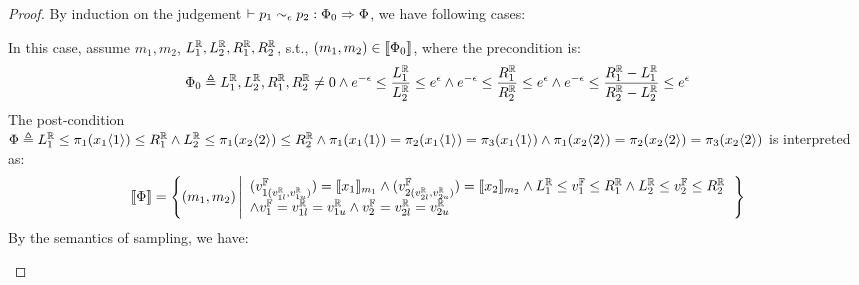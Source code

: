 \documentclass[a4paper,11pt]{article}
\begin{document}
\begin{proof}
By induction on the judgement $\vdash p_1	
\sim_{\epsilon}
p_2 :
\Phi_0 \Rightarrow \Phi $, we have following cases:
\begin{itemize}
\caseL{\[
	\inferrule*[right = Unif]
{
\empty
}
{
	\vdash
	\varx_1 \samplel \uniform(0, 1) 	
	\sim_{\epsilon+\ln(\frac{\rvalR_2}{\rvalL_2})} 
	\varx_2 \samplel \uniform(0, 1)
	:
	\rvalL_1, \rvalL_2, \rvalR_1, \rvalR_2 \neq 0
	\land
	e^{-\epsilon} \leq 
	\frac{\rvalL_1}{\rvalL_2}
	\leq e^{\epsilon}
	\land
	e^{-\epsilon} \leq 
	\frac{\rvalR_1}{\rvalR_2}
	\leq e^{\epsilon}
	\\
	\land
	e^{-\epsilon} \leq 
	\frac{\rvalR_1 - \rvalL_1}{\rvalR_2 - \rvalL_2}
	\leq e^{\epsilon}
	\Rightarrow  
	\rvalL_1 \leq \pi_1(\varx_1\langle 1 \rangle) \leq \rvalR_1 
	\land 
	\rvalL_2 \leq \pi_1 (\varx_2\langle 2 \rangle) \leq \rvalR_2
	\\
	\land 
	\pi_1(\varx_1\langle 1 \rangle) = \pi_2(\varx_1\langle 1 \rangle) = \pi_3(\varx_1\langle 1 \rangle)
	\land 
	\pi_1 (\varx_2\langle 2 \rangle) = \pi_2 (\varx_2\langle 2 \rangle) = \pi_3 (\varx_2\langle 2 \rangle)
}
\]}
	In this case, 
	assume $m_1, m_2$, $L^{\mathbb{R}}_1, L^{\mathbb{R}}_2, R^{\mathbb{R}}_1, R^{\mathbb{R}}_2$, s.t.,
	$(m_1, m_2) \in \llbracket \Phi_0 \rrbracket$, where the precondition is:
	$$
	\Phi_0 \triangleq
	L^{\mathbb{R}}_1, L^{\mathbb{R}}_2, R^{\mathbb{R}}_1, R^{\mathbb{R}}_2 \neq 0
	\land 
	e^{-\epsilon} \leq 
	\frac{L^{\mathbb{R}}_1}{L^{\mathbb{R}}_2}
	\leq e^{\epsilon}
	\land
	e^{-\epsilon} \leq 
	\frac{R^{\mathbb{R}}_1}{R^{\mathbb{R}}_2}
	\leq e^{\epsilon}
	\land
	e^{-\epsilon} \leq 
	\frac{R^{\mathbb{R}}_1 - L^{\mathbb{R}}_1}{R^{\mathbb{R}}_2 - L^{\mathbb{R}}_2}
	\leq e^{\epsilon}
	$$
	The post-condition $\Phi \triangleq L^{\mathbb{R}}_1 \leq \pi_1(x_1\langle 1 \rangle) \leq R^{\mathbb{R}}_1 
	\land 
	L^{\mathbb{R}}_2 \leq \pi_1 (x_2\langle 2 \rangle) \leq R^{\mathbb{R}}_2
	\land
	\pi_1(x_1\langle 1 \rangle) = \pi_2(x_1\langle 1 \rangle) = \pi_3(x_1\langle 1 \rangle)
	\land 
	\pi_1 (x_2\langle 2 \rangle) = \pi_2 (x_2\langle 2 \rangle) = \pi_3 (x_2\langle 2 \rangle)
	$ is interpreted as:
\[
	\llbracket \Phi \rrbracket =
	\left \{
	(m_1, m_2)
	\left \vert
	\begin{array}{l}
	(v^{\mathbb{F}}_{1(v^{\mathbb{R}}_{1l}, v^{\mathbb{R}}_{1u})}) = \llbracket x_1 \rrbracket_{m_1}
	\land
	(v^{\mathbb{F}}_{2(v^{\mathbb{R}}_{2l}, v^{\mathbb{R}}_{2u})}) = \llbracket x_2 \rrbracket_{m_2}
	\land
	L^{\mathbb{R}}_1 \leq v^{\mathbb{F}}_1 \leq R^{\mathbb{R}}_1
	\land 
	L^{\mathbb{R}}_2 \leq v^{\mathbb{F}}_2 \leq R^{\mathbb{R}}_2
	\\
	\land
	v^{\mathbb{F}}_1 = v^{\mathbb{R}}_{1l} = v^{\mathbb{R}}_{1u}
	\land 
	v^{\mathbb{F}}_2 = v^{\mathbb{R}}_{2l} = v^{\mathbb{R}}_{2u}
	\end{array}
	\right.
	\right \}
\]
	By the semantics of sampling, we have:\\

\end{itemize}
\end{proof}
\end{document}

